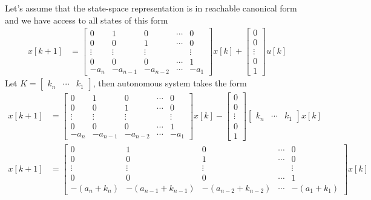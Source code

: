 \documentclass[twoside]{article}
\begin{document}
Let's assume that the state-space representation is in reachable canonical form and we have access to all states of this form
%
\begin{align*}
x[k+1] &= \left[ \begin{array}{ccccc} 0 & 1 & 0 & \cdots & 0 \\ 0 & 0 & 1 &
                                                                      \cdots & 0
\\ \vdots & \vdots & \vdots & & \vdots
\\ 0 & 0 & 0 & \cdots & 1
    \\ -a_n & -a_{n-1} & -a_{n-2} & \cdots & -a_1 \end{array} \right] x[k] +
\left[ \begin{array}{c} 0\\ 0 \\ \vdots \\ 0
    \\ 1 \end{array} \right] u[k]
\end{align*}
%
Let $K = \left[ \begin{array}{ccc} k_n & \cdots & k_1 \end{array} \right]$, then
autonomous system takes the form
%
%
\begin{align*}
x[k+1] &= \left[ \begin{array}{ccccc} 0 & 1 & 0 & \cdots & 0 \\ 0 & 0 & 1 &
                                                                      \cdots & 0
\\ \vdots & \vdots & \vdots & & \vdots
\\ 0 & 0 & 0 & \cdots & 1
    \\ -a_n & -a_{n-1} & -a_{n-2} & \cdots & -a_1 \end{array} \right] x[k] -
\left[ \begin{array}{c} 0\\ 0 \\ \vdots \\ 0
    \\ 1 \end{array} \right] 
\left[ \begin{array}{ccc} k_n & \cdots & k_1 \end{array} \right]
x[k]
\\
x[k+1] &= \left[ \begin{array}{ccccc} 0 & 1 & 0 & \cdots & 0 \\ 0 & 0 & 1 &
                                                                      \cdots & 0
\\ \vdots & \vdots & \vdots & & \vdots
\\ 0 & 0 & 0 & \cdots & 1
    \\ -(a_n+k_n) & -(a_{n-1} + k_{n-1}) & -(a_{n-2} + k_{n-2}) &
                                                                  \cdots
                                                         & -(a_1 + k_1) \end{array} \right] x[k]
\end{align*}
\end{document}
